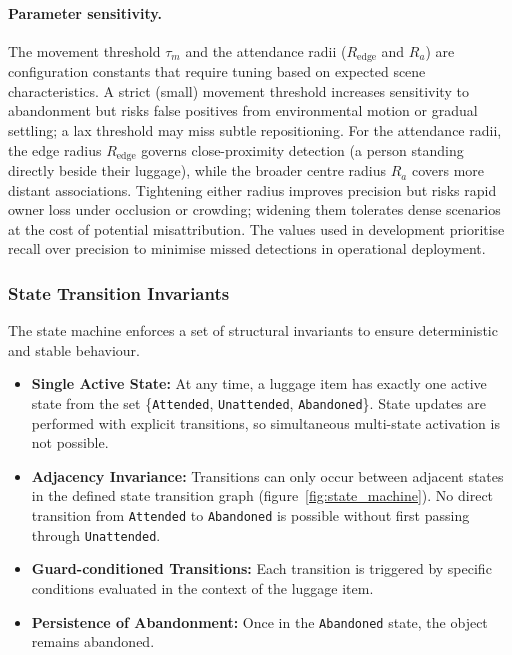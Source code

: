 \paragraph{Parameter sensitivity.}

The movement threshold $\tau_m$ and the attendance radii ($R_{\text{edge}}$ and
$R_a$) are configuration constants that require tuning based on expected scene
characteristics. A strict (small) movement threshold increases sensitivity to
abandonment but risks false positives from environmental motion or gradual
settling; a lax threshold may miss subtle repositioning. For the attendance
radii, the edge radius $R_{\text{edge}}$ governs close-proximity detection (a
person standing directly beside their luggage), while the broader centre radius
$R_a$ covers more distant associations. Tightening either radius improves
precision but risks rapid owner loss under occlusion or crowding; widening them
tolerates dense scenarios at the cost of potential misattribution. The values
used in development prioritise recall over precision to minimise missed
detections in operational deployment.

\subsubsection{State Transition Invariants}
\label{sec:state_transition_invariants}

The state machine enforces a set of structural invariants to ensure
deterministic and stable behaviour.

\begin{itemize}
	\item \textbf{Single Active State:} At any time, a luggage item has exactly
	      one active state from the set \{\texttt{Attended}, \texttt{Unattended},
	      \texttt{Abandoned}\}. State updates are performed with explicit
	      transitions, so simultaneous multi-state activation is not possible.
	\item \textbf{Adjacency Invariance:} Transitions can only occur between
	      adjacent states in the defined state transition graph
	      (figure~\ref{fig:state_machine}). No direct transition from
	      \texttt{Attended} to \texttt{Abandoned} is possible without first
	      passing through \texttt{Unattended}.
	\item \textbf{Guard-conditioned Transitions:} Each transition is triggered by
	      specific conditions evaluated in the context of the luggage item.
	\item \textbf{Persistence of Abandonment:} Once in the \texttt{Abandoned}
	      state, the object remains abandoned.
\end{itemize}

